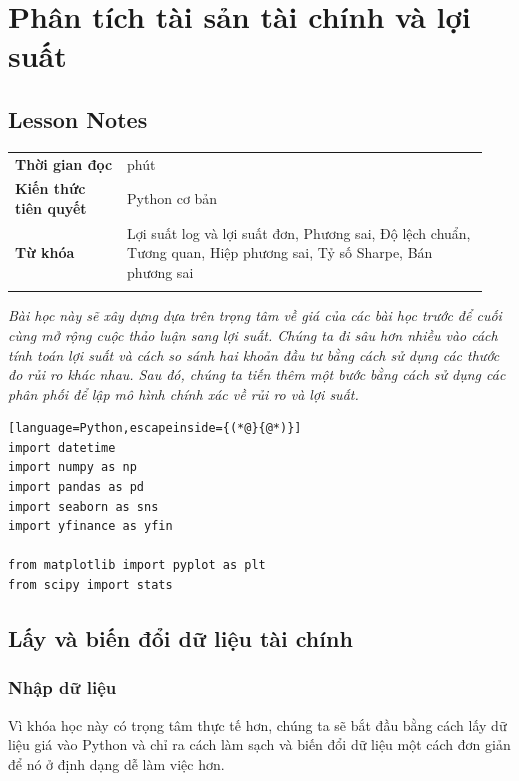 \chapter{Phân tích tài sản tài chính và lợi suất}
\label{ch:M2L2}


\section*{Lesson Notes}

{\small
\begin{longtable}{>{\raggedright\arraybackslash}p{0.226\linewidth}>{\raggedright\arraybackslash}p{0.714\linewidth}}
\toprule
\textbf{Thời gian đọc} & 60 phút \\
\addlinespace[2pt]
\textbf{Kiến thức tiên quyết} & Python cơ bản \\
\addlinespace[2pt]
\textbf{Từ khóa} & Lợi suất log và lợi suất đơn, Phương sai, Độ lệch chuẩn, Tương quan, Hiệp phương sai, Tỷ số Sharpe, Bán phương sai \\
\addlinespace[2pt]
\bottomrule
\end{longtable}
}

\emph{Bài học này sẽ xây dựng dựa trên trọng tâm về giá của các bài học trước để cuối cùng mở rộng cuộc thảo luận sang lợi suất. Chúng ta đi sâu hơn nhiều vào cách tính toán lợi suất và cách so sánh hai khoản đầu tư bằng cách sử dụng các thước đo rủi ro khác nhau. Sau đó, chúng ta tiến thêm một bước bằng cách sử dụng các phân phối để lập mô hình chính xác về rủi ro và lợi suất.}

\begin{lstlisting}[language=Python,escapeinside={(*@}{@*)}]
import datetime
import numpy as np
import pandas as pd
import seaborn as sns
import yfinance as yfin

from matplotlib import pyplot as plt
from scipy import stats
\end{lstlisting}

\section{Lấy và biến đổi dữ liệu tài chính}

\subsection{Nhập dữ liệu}

Vì khóa học này có trọng tâm thực tế hơn, chúng ta sẽ bắt đầu bằng cách lấy dữ liệu giá vào Python và chỉ ra cách làm sạch và biến đổi dữ liệu một cách đơn giản để nó ở định dạng dễ làm việc hơn.

